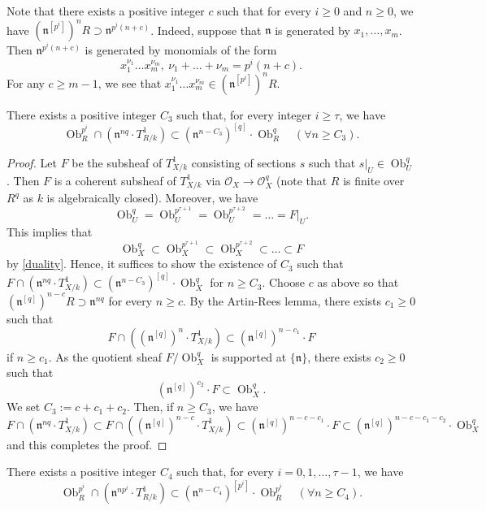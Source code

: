 \documentclass{amsart}
\begin{document}
Note that there exists a positive integer $c$ such that for every $i\ge 0$ and $n\ge 0$, we have $(\mathfrak{n}^{[p^i]})^nR\supset \mathfrak{n}^{p^i(n+c)}$. Indeed, suppose that $\mathfrak{n}$ is generated by $x_1,\dots,x_m$. Then $\mathfrak{n}^{p^i(n+c)}$ is generated by monomials of the form
$$x_1^{\nu_1}\dots x_m^{\nu_m},\ \nu_1+\dots +\nu_m=p^i(n+c).$$
 For any $c\ge m-1$, we see that $x_1^{\nu_1}\dots x_m^{\nu_m}\in (\mathfrak{n}^{[p^i]})^nR$.

\begin{lemma}\label{i lem}
    There exists a positive integer $C_3$ such that, for every integer $i\ge \tau$, we have $$\operatorname{Ob}_R^{p^i}\cap (\mathfrak{n}^{nq}\cdot T_{R/k}^1)\subset (\mathfrak{n}^{n-C_3})^{[q]} \cdot \operatorname{Ob}_R^{q}\quad (\forall n\ge C_3).$$
\end{lemma}

\begin{proof}
Let $F$ be the subsheaf of $T_{X/k}^1$ consisting of sections $s$ such that $s|_U\in \operatorname{Ob}_U^{q}$. Then $F$ is a coherent subsheaf of $T_{X/k}^1$ via $\mathcal{O}_X\to \mathcal{O}_X^{q}$ (note that $R$ is finite over $R^q$ as $k$ is algebraically closed). Moreover, we have
$$\operatorname{Ob}_U^{q}=\operatorname{Ob}_U^{p^{\tau+1}}=\operatorname{Ob}_U^{p^{\tau+2}}=\dots=F|_U.$$
This implies that
$$\operatorname{Ob}_X^{q}\subset\operatorname{Ob}_X^{p^{\tau+1}}\subset\operatorname{Ob}_X^{p^{\tau+2}}\subset \dots\subset F$$
by \ref{duality}. Hence, it suffices to show the existence of $C_3$ such that $F\cap (\mathfrak{n}^{nq}\cdot T_{X/k}^1)\subset (\mathfrak{n}^{n-C_3})^{[q]} \cdot \operatorname{Ob}_X^{q}$ for $n\ge C_3$. Choose $c$ as above so that $(\mathfrak{n}^{[q]})^{n-c}R\supset \mathfrak{n}^{nq}$ for every $n\ge c$.
By the Artin-Rees lemma, there exists $c_1\ge 0$ such that
$$F\cap ((\mathfrak{n}^{[q]})^n\cdot T_{X/k}^1)\subset (\mathfrak{n}^{[q]})^{n-c_1}\cdot F$$
if $n\ge c_1$. As the quotient sheaf $F/\operatorname{Ob}_X^q$ is supported at $\{\mathfrak{n}\}$, there exists $c_2\ge 0$ such that 
$$(\mathfrak{n}^{[q]})^{c_2}\cdot F\subset \operatorname{Ob}_X^q.$$
We set $C_3:=c+c_1+c_2$. Then, if $n\ge C_3$, we have
$$F\cap (\mathfrak{n}^{nq}\cdot T_{X/k}^1)\subset F\cap ((\mathfrak{n}^{[q]})^{n-c}\cdot T_{X/k}^1)\subset (\mathfrak{n}^{[q]})^{n-c-c_1}\cdot F\subset (\mathfrak{n}^{[q]})^{n-c-c_1-c_2} \cdot \operatorname{Ob}_X^{q}$$
and this completes the proof.
\end{proof}

\begin{lemma}\label{j lem}
    There exists a positive integer $C_4$ such that, for every $i=0,1,\dots,\tau-1$, we have $$\operatorname{Ob}_R^{p^i}\cap (\mathfrak{n}^{np^i}\cdot T_{R/k}^1)\subset (\mathfrak{n}^{n-C_4})^{[p^i]} \cdot \operatorname{Ob}_R^{p^i}\quad (\forall n\ge C_4).$$
\end{lemma}
\end{document}
